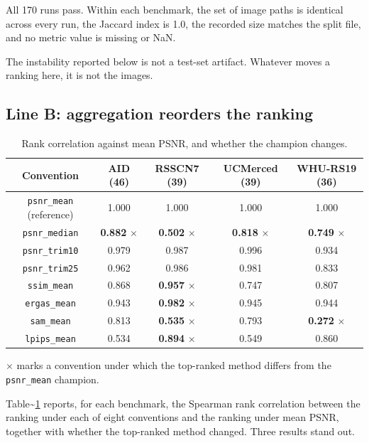 \documentclass{interact}
\newlength{\tblavail}
\begin{document}
All 170 runs pass. Within each benchmark, the set of image paths is identical across every run, the Jaccard index is 1.0, the recorded size matches the split file, and no metric value is missing or NaN.

The instability reported below is not a test-set artifact. Whatever moves a ranking here, it is not the images.

\subsection{Line B: aggregation reorders the ranking}\label{sec:champion}

\begin{table}[tbp]
\centering
\footnotesize
\setlength{\tabcolsep}{3pt}
\setlength{\tblavail}{\dimexpr\textwidth-10\tabcolsep\relax}
\begin{tabular}{ccccc}
\hline
Convention & AID (46) & RSSCN7 (39) & UCMerced (39) & WHU-RS19 (36) \\
\hline
\texttt{psnr\_\allowbreak mean} (reference) & 1.000 & 1.000 & 1.000 & 1.000 \\
\texttt{psnr\_\allowbreak median} & \textbf{0.882} $\times$ & \textbf{0.502} $\times$ & \textbf{0.818} $\times$ & \textbf{0.749} $\times$ \\
\texttt{psnr\_\allowbreak trim10} & 0.979 & 0.987 & 0.996 & 0.934 \\
\texttt{psnr\_\allowbreak trim25} & 0.962 & 0.986 & 0.981 & 0.833 \\
\texttt{ssim\_\allowbreak mean} & 0.868 & \textbf{0.957} $\times$ & 0.747 & 0.807 \\
\texttt{ergas\_\allowbreak mean} & 0.943 & \textbf{0.982} $\times$ & 0.945 & 0.944 \\
\texttt{sam\_\allowbreak mean} & 0.813 & \textbf{0.535} $\times$ & 0.793 & \textbf{0.272} $\times$ \\
\texttt{lpips\_\allowbreak mean} & 0.534 & \textbf{0.894} $\times$ & 0.549 & 0.860 \\
\hline
\end{tabular}
\caption{Rank correlation against mean PSNR, and whether the champion changes.}\label{tab:conventions}
\end{table}

$\times$ marks a convention under which the top-ranked method differs from the \texttt{psnr\_\allowbreak mean} champion.

Table\textasciitilde{}\ref{tab:conventions} reports, for each benchmark, the Spearman rank correlation between the ranking under each of eight conventions and the ranking under mean PSNR, together with whether the top-ranked method changed. Three results stand out.
\end{document}
